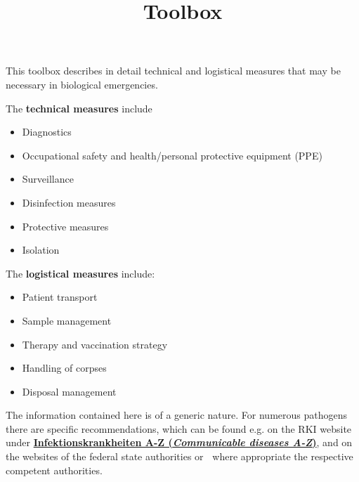 \documentclass{article}
\begin{document}
\title{Toolbox}

\maketitle


This toolbox describes in detail technical and logistical measures that may be necessary in biological emergencies.


The \textbf{technical measures} include

\begin{itemize}
\item Diagnostics


\item Occupational safety and health/personal protective equipment (PPE)


\item Surveillance


\item Disinfection measures


\item Protective measures


\item Isolation


\end{itemize}




The \textbf{logistical measures} include:

\begin{itemize}
\item Patient transport


\item Sample management


\item Therapy and vaccination strategy


\item Handling of corpses


\item Disposal management


\end{itemize}

The information contained here is of a generic nature. For numerous pathogens there are specific recommendations, which can be found e.g. on the RKI website under\textbf{ }\textbf{\href{https://www.rki.de/DE/Content/InfAZ/InfAZ_marginal_node.html}{Infektionskrankheiten A-Z (}}\emph{\textbf{\href{https://www.rki.de/DE/Content/InfAZ/InfAZ_marginal_node.html}{Communicable diseases A-Z}}}\textbf{\href{https://www.rki.de/DE/Content/InfAZ/InfAZ_marginal_node.html}{)}},\textbf{ }and on the websites of the federal state authorities or \textbf{ }where appropriate the respective competent authorities.
\end{document}

